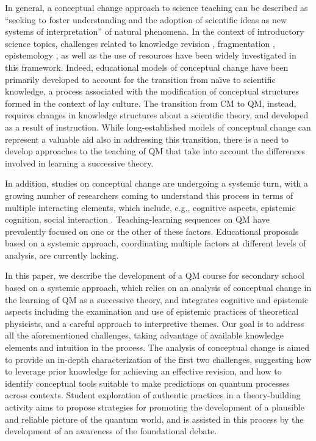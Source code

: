 \documentclass[twocolumn,secnumarabic,amssymb, nobibnotes, aps, prd, nofootinbib]{revtex4-2}
\begin{document}
In general, a conceptual change approach to science teaching can be described as ``seeking to foster understanding and the adoption of scientific ideas as new systems of interpretation'' \cite{Amin2014} of natural phenomena.
In the context of introductory science topics, challenges related to knowledge revision \cite{Carey1999, Chi2013, Vosniadou2008}, fragmentation \cite{Vosniadou2008, diSessa2014}, epistemology \cite{Amin2014}, as well as the use of resources \cite{diSessa2014} have been widely investigated in this framework. Indeed, educational models of conceptual change have been primarily developed to account for the transition from na\"{\i}ve to scientific knowledge, a process associated with the modification of conceptual structures formed in the context of lay culture. The transition from CM to QM, instead, requires changes in knowledge structures about a scientific theory, and developed as a result of instruction. While long-established models of conceptual change can represent a valuable aid also in addressing this transition, there is a need to develop approaches to the teaching of QM that take into account the differences involved in learning a successive theory.

In addition, studies on conceptual change are undergoing a systemic turn, with a growing number of researchers coming to understand this process in terms of multiple interacting elements, which include, e.g., cognitive aspects, epistemic cognition, social interaction \cite{Amin2014}. Teaching-learning sequences on QM have prevalently focused on one or the other of these factors. Educational proposals based on a systemic approach, coordinating multiple factors at different levels of analysis, are currently lacking.

In this paper, we describe the development of a QM course for secondary school based on a systemic approach, which relies on an analysis of conceptual change in the learning of QM as a successive theory, and integrates cognitive and epistemic aspects including the examination and use of epistemic practices of theoretical physicists, and a careful approach to interpretive themes. Our goal is to address all the aforementioned challenges, taking advantage of available knowledge elements and intuition in the process. The analysis of conceptual change is aimed to provide an in-depth characterization of the first two challenges, suggesting how to leverage prior knowledge for achieving an effective revision, and how to identify conceptual tools suitable to make predictions on quantum processes across contexts. Student exploration of authentic practices in a theory-building activity aims to propose strategies for promoting the development of a plausible and reliable picture of the quantum world, and is assisted in this process by the development of an awareness of the foundational debate.
\end{document}
